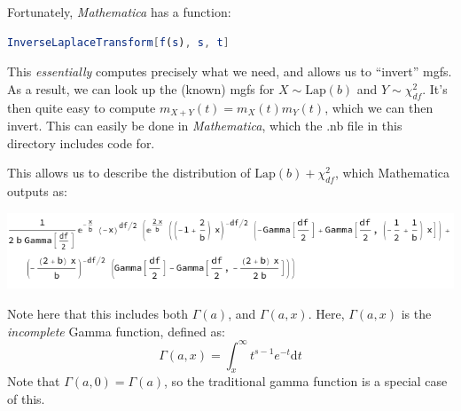 \documentclass{article}
\begin{document}
Fortunately, \emph{Mathematica} has a function:
\begin{center}
\begin{lstlisting}[language=Mathematica]
InverseLaplaceTransform[f(s), s, t]
\end{lstlisting}
\end{center}
This \emph{essentially} computes precisely what we need, and allows us to ``invert'' mgfs.
As a result, we can look up the (known) mgfs for $X\sim\text{Lap}(b)$ and $Y\sim\chi^2_{df}$.
It's then quite easy to compute $m_{X+Y}(t) = m_X(t)m_Y(t)$, which we can then invert.
This can easily be done in \emph{Mathematica}, which the .nb file in this directory includes code for.

This allows us to describe the distribution of $\text{Lap}(b) + \chi^2_{df}$, which Mathematica outputs as:
\begin{center}
\includegraphics[scale=.5]{distribution.png}
\end{center}
Note here that this includes both $\Gamma(a)$, and $\Gamma(a,x)$.
Here, $\Gamma(a,x)$ is the \emph{incomplete} Gamma function, defined as:
\begin{equation}
\Gamma(a,x) = \int_x^\infty t^{s-1}e^{-t}\mathrm{ d}t
\end{equation}
Note that $\Gamma(a,0) = \Gamma(a)$, so the traditional gamma function is a special case of this.
\end{document}
